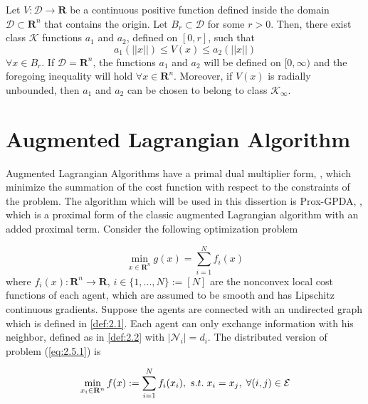     \begin{lemma}\label{lem:2.1}
        \cite{HK2001} Let $V: \mathcal{D} \to \mathbf{R}$ be a continuous positive function defined inside the domain $\mathcal{D} \subset \mathbf{R}^n$ that contains the origin. Let $B_r \subset \mathcal{D}$ for some $r > 0$. Then, there exist class $\mathcal{K}$ functions $a_1$ and $a_2$, defined on $[0,r]$, such that
        \begin{equation}\label{eq:2.4.4}
            a_1(||x||) \leq V(x) \leq a_2(||x||)
        \end{equation}
        $\forall x \in B_r$. If $\mathcal{D} = \mathbf{R}^n$, the functions $a_1$ and $a_2$ will be defined on $[0, \infty)$ and the foregoing inequality will hold $\forall x \in \mathbf{R}^n$. Moreover, if $V(x)$ is radially unbounded, then $a_1$ and $a_2$ can be chosen to belong to class $\mathcal{K}_{\infty}$.
    \end{lemma}
        

\section{Augmented Lagrangian Algorithm}

Augmented Lagrangian Algorithms have a primal dual multiplier form, \cite{bertsekas2015incremental}, which minimize the summation of the cost function with respect to the constraints of the problem. The algorithm which will be used in this dissertion is Prox-GPDA, \cite{pmlr-v70-hong17a,hong2016decomposing}, which is a proximal form of the classic augmented Lagrangian algorithm with an added proximal term. Consider the following optimization problem

\begin{equation}\label{eq:2.5.1}
    \min_{x \in \mathbf{R}^n} g(x) = \sum_{i = 1}^{N} f_i(x)
\end{equation}
where $f_i(x):\mathbf{R}^n \to \mathbf{R}$, $i\in \{1,...,N\}:= [N]$ are the nonconvex local cost functions of each agent, which are assumed to be smooth and has Lipschitz continuous gradients. Suppose the agents are connected with an undirected graph which is defined in \ref{def:2.1}. Each agent can only exchange information with his neighbor, defined as in \ref{def:2.2} with $|\mathcal{N}_i| = d_i$. The distributed version of problem (\ref{eq:2.5.1}) is

\begin{equation}\label{eq:2.5.2}
    \min_{x_i \in \mathbf{R}^n} f(x) := \sum_{i = 1}^{N} f_i(x_i),\hspace{1.0mm} s.t.\hspace{1.0mm} x_i = x_j,\hspace{1.0mm} \forall (i,j) \in \mathcal{E}
\end{equation}

